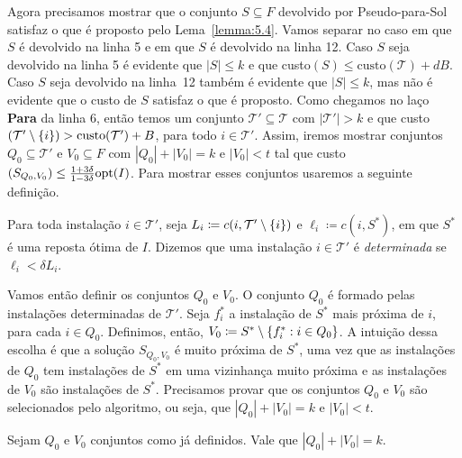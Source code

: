 Agora precisamos mostrar que o conjunto $S \subseteq F$ devolvido por {\sc Pseudo-para-Sol} satisfaz o que é proposto pelo Lema~\ref{lemma:5.4}. Vamos separar no caso em que $S$ é devolvido na linha 5 e em que $S$ é devolvido na linha 12. Caso $S$ seja devolvido na linha 5 é evidente que $|S| \leq k$ e que custo$(S) \leq \text{custo}(\mathcal{T}) + dB$. Caso $S$ seja devolvido na linha~12 também é evidente que $|S| \leq k$, mas não é evidente que o custo de $S$ satisfaz o que é proposto. Como chegamos no laço {\bf Para} da linha 6, então temos um conjunto $\mathcal{T}' \subseteq \mathcal{T}$ com $|\mathcal{T}'| > k$ e que custo$(\mathcal{T}' \setminus \{i\}) > \text{custo}(\mathcal{T}') + B$, para todo $i \in \mathcal{T}'$.  Assim, iremos mostrar conjuntos $Q_0 \subseteq \mathcal{T}'$ e $V_0 \subseteq F$ com $|Q_0| + |V_0| = k$ e $|V_0| < t$ tal que custo$(S_{Q_0,V_0}) \leq \frac{1+3\delta}{1-3\delta}\mathrm{opt}(I)$.
Para mostrar esses conjuntos usaremos a seguinte definição.
\begin{definition}
    Para toda instalação $i \in \mathcal{T}'$, seja $L_i \coloneqq c(i,\mathcal{T}' \setminus \{i\})$ e $\ell_i \coloneqq c(i,S^*)$, em que $S^*$ é uma reposta ótima de $I$. Dizemos que uma instalação $i \in \mathcal{T}'$ é \emph{determinada} se $\ell_i < \delta L_i$.
\end{definition}
Vamos então definir os conjuntos $Q_0$ e $V_0$. O conjunto $Q_0$ é formado pelas instalações determinadas de $\mathcal{T}'$. Seja $f_i^*$ a instalação de $S^*$ mais próxima de $i$, para cada $i \in Q_0$. Definimos, então, $V_0 \coloneqq S^* \setminus \{f_i^* : i\in Q_0\}$. A intuição dessa escolha é que a solução $S_{Q_0,V_0}$ é muito próxima de $S^*$, uma vez que as instalações de $Q_0$ tem instalações de $S^*$ em uma vizinhança muito próxima e as instalações de $V_0$ são instalações de $S^*$. Precisamos provar que os conjuntos $Q_0$ e $V_0$ são selecionados pelo algoritmo, ou seja, que $|Q_0| + |V_0| = k$ e $|V_0| < t$.

\begin{lemma}
    Sejam $Q_0$ e $V_0$ conjuntos como já definidos. Vale que ${|Q_0| + |V_0| = k}$.
\end{lemma}

